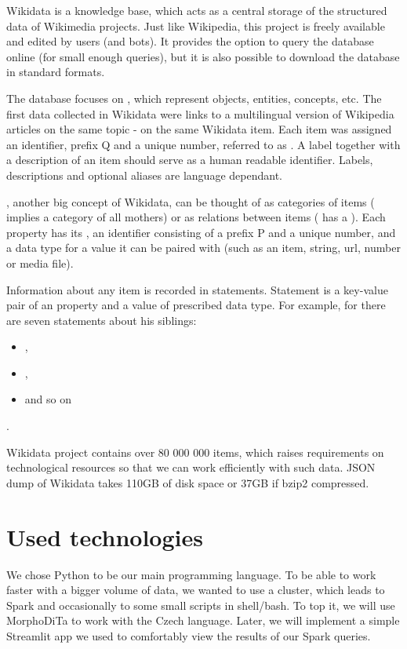 Wikidata is a knowledge base, which acts as a central storage of the structured data of Wikimedia projects. Just like Wikipedia, this project is freely available and edited by users (and bots). It provides the option to query the database online (for small enough queries), but it is also possible to download the database in standard formats.

The database focuses on , which represent objects, entities, concepts, etc.  The first data collected in Wikidata were links to a multilingual version of Wikipedia articles on the same topic - on the same Wikidata item. Each item was assigned an identifier, prefix Q and a unique number, referred to as . A label together with a description of an item should serve as a human readable identifier. Labels, descriptions and optional aliases are language dependant.

, another big concept of Wikidata, can be thought of as categories of items ( implies a category of all mothers) or as relations between items ( has a  ). Each property has its , an identifier consisting of a prefix P and a unique number, and a data type for a value it can be paired with (such as an item, string, url, number or media file). 

Information about any item is recorded in statements. Statement is a key-value pair of an property and a value of prescribed data type. For example, for  there are seven statements about his siblings:
\begin{itemize}
\item {} ,
\item {} ,
\item {}  and so on
\end{itemize} . 

Wikidata project contains over 80 000 000 items, which raises requirements on technological resources so that we can work efficiently with such data. JSON dump of Wikidata takes 110GB of disk space or 37GB if bzip2 compressed.



\section{Used technologies}
We chose Python to be our main programming language. To be able to work faster with a bigger volume of data, we wanted to use a cluster, which leads to Spark and occasionally to some small scripts in shell/bash. To top it, we will use MorphoDiTa to work with the Czech language. Later, we will implement a simple Streamlit app we used to comfortably view the results of our Spark queries.

